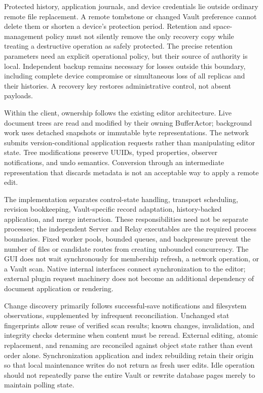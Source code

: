 \documentclass[11pt,a4paper]{article}
\theoremstyle{definition}
\theoremstyle{plain}
\begin{document}
Protected history, application journals, and device credentials lie
outside ordinary remote file replacement. A remote tombstone or changed
Vault preference cannot delete them or shorten a device's protection
period. Retention and space-management policy must not silently remove
the only recovery copy while treating a destructive operation as safely
protected. The precise retention parameters need an explicit operational
policy, but their source of authority is local. Independent backup
remains necessary for losses outside this boundary, including complete
device compromise or simultaneous loss of all replicas and their
histories. A recovery key restores administrative control, not absent
payloads.

Within the client, ownership follows the existing editor architecture.
Live document trees are read and modified by their owning BufferActor;
background work uses detached snapshots or immutable byte representations.
The network submits version-conditional application requests rather
than manipulating editor state. Tree modifications preserve UUIDs,
typed properties, observer notifications, and undo semantics. Conversion
through an intermediate representation that discards metadata is not
an acceptable way to apply a remote edit.

The implementation separates control-state handling, transport scheduling,
revision bookkeeping, Vault-specific record adaptation, history-backed
application, and merge interaction. These responsibilities need not be
separate processes; the independent Server and Relay executables are
the required process boundaries. Fixed worker pools, bounded queues,
and backpressure prevent the number of files or candidate routes from
creating unbounded concurrency. The GUI does not wait synchronously
for membership refresh, a network operation, or a Vault scan. Native
internal interfaces connect synchronization to the editor; external
plugin request machinery does not become an additional dependency of
document application or rendering.

Change discovery primarily follows successful-save notifications and
filesystem observations, supplemented by infrequent reconciliation.
Unchanged stat fingerprints allow reuse of verified scan results;
known changes, invalidation, and integrity checks determine when content
must be reread. External editing, atomic replacement, and renaming
are reconciled against object state rather than event order alone.
Synchronization application and index rebuilding retain their origin
so that local maintenance writes do not return as fresh user edits.
Idle operation should not repeatedly parse the entire Vault or rewrite
database pages merely to maintain polling state.
\end{document}
